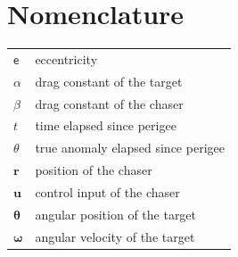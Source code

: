 \section{Nomenclature}
{\renewcommand\arraystretch{1.0}
\noindent\begin{longtable*}{@{}l @{\quad=\quad} l@{}}
$\mathsf{e}$            & eccentricity \\
$\alpha$                & drag constant of the target\\
$\beta$                 & drag constant of the chaser\\
$t$                     & time elapsed since perigee\\
$\theta$                & true anomaly elapsed since perigee\\
$\boldsymbol{r}$        & position of the chaser\\
$\boldsymbol{u}$        & control input of the chaser\\
$\boldsymbol{\theta}$   & angular position of the target\\
$\boldsymbol{\omega}$   & angular velocity of the target\\
\end{longtable*}}